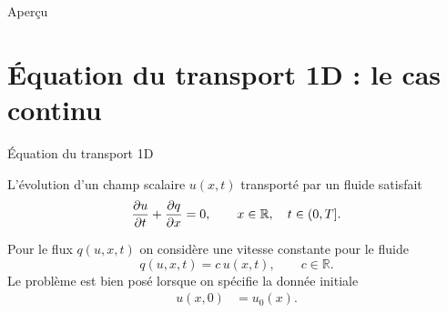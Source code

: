 \documentclass[aspectratio=169, french]{beamer}
\newcommand{\bbR}{\mathbb{R}}
\begin{document}
	
	
\begin{frame}[plain]
	
	
	
\end{frame}
	
	
\begin{frame}{Aperçu}
	
	\tableofcontents
	
\end{frame}

\section{Équation du transport 1D : le cas continu}

\begin{frame}{Équation du transport 1D}
	\begin{tcolorbox}[title = L'EDP la plus simple, coltitle=white]
		L'évolution d'un champ scalaire $u(x, t)$ transporté par un fluide satisfait 
		\begin{equation*}
			\diffp{u}{t} + \diffp{q}{x} = 0, \qquad x \in \bbR, \quad t \in  (0, T]. 
		\end{equation*}
	\end{tcolorbox}

\begin{tcolorbox}
	Pour le flux $q(u, x, t)$ on considère une vitesse constante pour le fluide
	\begin{equation*}
		q(u, x, t) = c \, u(x, t), \qquad c \in \bbR.
	\end{equation*}
	Le problème est bien posé lorsque on spécifie la donnée initiale
	\begin{align*}
		u(x, 0) &= u_0(x). 
	\end{align*}
\end{tcolorbox}

\end{frame}
\end{document}
